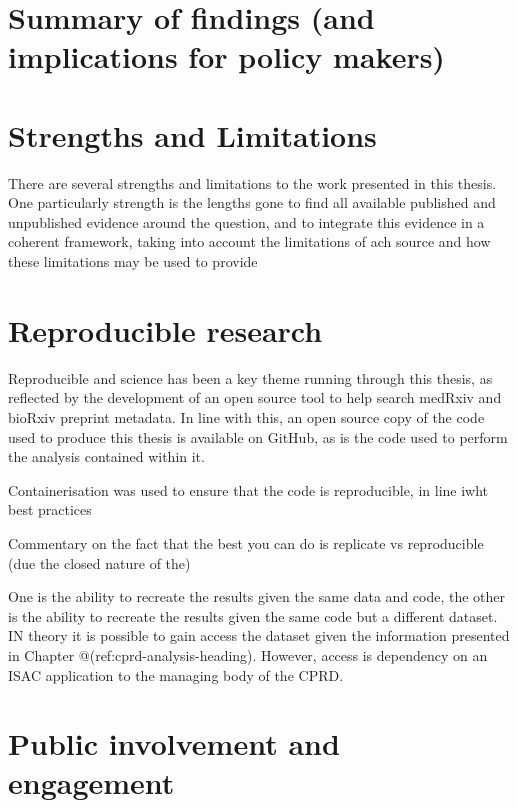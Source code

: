 \documentclass[a4paper, twoside]{templates/ociamthesis}
\begin{document}
\hypertarget{summary-of-findings-and-implications-for-policy-makers}{%
\section{Summary of findings (and implications for policy makers)}\label{summary-of-findings-and-implications-for-policy-makers}}

\hypertarget{strengths-and-limitations}{%
\section{Strengths and Limitations}\label{strengths-and-limitations}}

There are several strengths and limitations to the work presented in this thesis. One particularly strength is the lengths gone to find all available published and unpublished evidence around the question, and to integrate this evidence in a coherent framework, taking into account the limitations of ach source and how these limitations may be used to provide

\hypertarget{reproducible-research}{%
\section{Reproducible research}\label{reproducible-research}}

Reproducible and science has been a key theme running through this thesis, as reflected by the development of an open source tool to help search medRxiv and bioRxiv preprint metadata. In line with this, an open source copy of the code used to produce this thesis is available on GitHub, as is the code used to perform the analysis contained within it.

Containerisation was used to ensure that the code is reproducible, in line iwht best practices

Commentary on the fact that the best you can do is replicate vs reproducible (due the closed nature of the)

One is the ability to recreate the results given the same data and code, the other is the ability to recreate the results given the same code but a different dataset. IN theory it is possible to gain access the dataset given the information presented in Chapter @(ref:cprd-analysis-heading). However, access is dependency on an ISAC application to the managing body of the CPRD.

\hypertarget{public-involvement-and-engagement}{%
\section{Public involvement and engagement}\label{public-involvement-and-engagement}}
\end{document}
